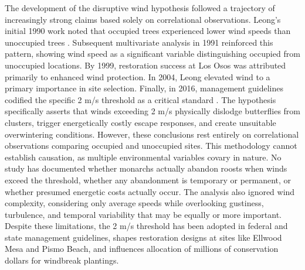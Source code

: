 The development of the disruptive wind hypothesis followed a trajectory of increasingly strong claims based solely on correlational observations. Leong's initial 1990 work noted that occupied trees experienced lower wind speeds than unoccupied trees \citep{leongMicroenvironmentalFactorsAssociated1990}. Subsequent multivariate analysis in 1991 reinforced this pattern, showing wind speed as a significant variable distinguishing occupied from unoccupied locations. By 1999, restoration success at Los Osos was attributed primarily to enhanced wind protection. In 2004, Leong elevated wind to a primary importance in site selection. Finally, in 2016, management guidelines codified the specific 2 m/s threshold as a critical standard \citep{leongEvaluationManagementCalifornia2016}. The hypothesis specifically asserts that winds exceeding 2 m/s physically dislodge butterflies from clusters, trigger energetically costly escape responses, and create unsuitable overwintering conditions. However, these conclusions rest entirely on correlational observations comparing occupied and unoccupied sites. This methodology cannot establish causation, as multiple environmental variables covary in nature. No study has documented whether monarchs actually abandon roosts when winds exceed the threshold, whether any abandonment is temporary or permanent, or whether presumed energetic costs actually occur. The analysis also ignored wind complexity, considering only average speeds while overlooking gustiness, turbulence, and temporal variability that may be equally or more important. Despite these limitations, the 2 m/s threshold has been adopted in federal and state management guidelines, shapes restoration designs at sites like Ellwood Mesa and Pismo Beach, and influences allocation of millions of conservation dollars for windbreak plantings.

